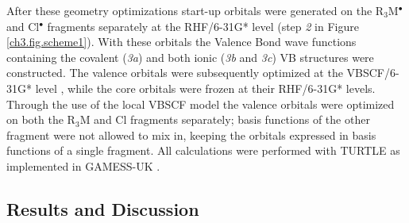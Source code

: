 After these geometry optimizations start-up orbitals were generated on the R$_3$M$^{\bullet}$ and Cl$^{\bullet}$ fragments separately at the \mbox{RHF/6-31G*} level (step \textit{2} in Figure \ref{ch3.fig.scheme1}).  With these orbitals the Valence Bond wave functions containing the covalent (\textit{3a}) and both ionic (\textit{3b} and \textit{3c}) VB structures were constructed. The valence orbitals were subsequently optimized at the \mbox{VBSCF/6-31G*} level \cite{vbscf1,vbscf2}, while the core orbitals were frozen at their \mbox{RHF/6-31G*} levels.
Through the use of the local VBSCF model the valence orbitals were optimized on both the R$_3$M and Cl fragments separately; basis functions of the other fragment were not allowed to mix in, keeping the orbitals expressed in basis functions of a single fragment. All calculations were performed with TURTLE \cite{turtle} as implemented in GAMESS-UK \cite{gamess}.

\subsection{Results and Discussion}

